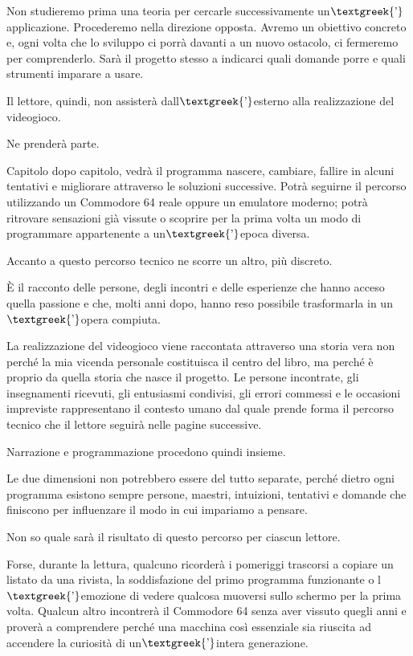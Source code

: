 \documentclass{article}
\begin{document}
Non studieremo prima una teoria per cercarle successivamente un$\text{\textgreek{’}}$applicazione. Procederemo nella
direzione opposta. Avremo un obiettivo concreto e, ogni volta che lo sviluppo ci porrà davanti a un nuovo ostacolo, ci
fermeremo per comprenderlo. Sarà il progetto stesso a indicarci quali domande porre e quali strumenti imparare a usare.

Il lettore, quindi, non assisterà dall$\text{\textgreek{’}}$esterno alla realizzazione del videogioco.

Ne prenderà parte.

Capitolo dopo capitolo, vedrà il programma nascere, cambiare, fallire in alcuni tentativi e migliorare attraverso le
soluzioni successive. Potrà seguirne il percorso utilizzando un Commodore 64 reale oppure un emulatore moderno; potrà
ritrovare sensazioni già vissute o scoprire per la prima volta un modo di programmare appartenente a
un$\text{\textgreek{’}}$epoca diversa.

Accanto a questo percorso tecnico ne scorre un altro, più discreto.

È il racconto delle persone, degli incontri e delle esperienze che hanno acceso quella passione e che, molti anni dopo,
hanno reso possibile trasformarla in un$\text{\textgreek{’}}$opera compiuta.

La realizzazione del videogioco viene raccontata attraverso una storia vera non perché la mia vicenda personale
costituisca il centro del libro, ma perché è proprio da quella storia che nasce il progetto. Le persone incontrate, gli
insegnamenti ricevuti, gli entusiasmi condivisi, gli errori commessi e le occasioni impreviste rappresentano il
contesto umano dal quale prende forma il percorso tecnico che il lettore seguirà nelle pagine successive.

Narrazione e programmazione procedono quindi insieme.

Le due dimensioni non potrebbero essere del tutto separate, perché dietro ogni programma esistono sempre persone,
maestri, intuizioni, tentativi e domande che finiscono per influenzare il modo in cui impariamo a pensare.

Non so quale sarà il risultato di questo percorso per ciascun lettore.

Forse, durante la lettura, qualcuno ricorderà i pomeriggi trascorsi a copiare un listato da una rivista, la
soddisfazione del primo programma funzionante o l$\text{\textgreek{’}}$emozione di vedere qualcosa muoversi sullo
schermo per la prima volta. Qualcun altro incontrerà il Commodore 64 senza aver vissuto quegli anni e proverà a
comprendere perché una macchina così essenziale sia riuscita ad accendere la curiosità di
un$\text{\textgreek{’}}$intera generazione.
\end{document}
